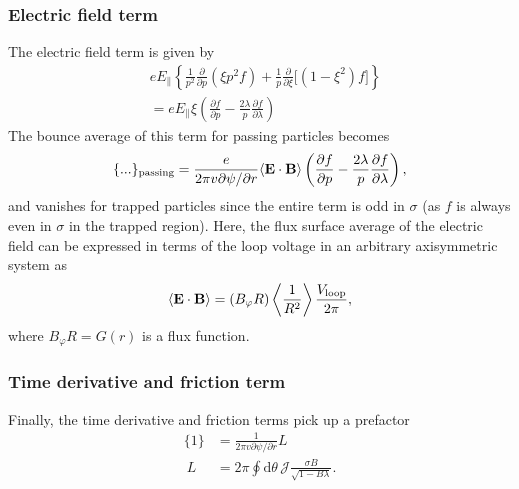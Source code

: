 \documentclass[11pt,a4paper]{article}
\newcommand{\rd}{\ensuremath{\mathrm{d}}}
\newcommand{\sub}[1]{\ensuremath{_{\text{#1}}}}
\renewcommand{\b}[1]{\ensuremath{ {\bf #1 } }}
\begin{document}
\subsubsection*{Electric field term}
The electric field term is given by
\begin{align}
&eE_\parallel \left\{\frac{1}{p^2}\frac{\partial}{\partial p}(\xi p^2 f) + \frac{1}{p}\frac{\partial}{\partial \xi}\Big[(1-\xi^2) f\Big] \right\} \nonumber \\
&= eE_\parallel \xi\left(\frac{\partial  f}{\partial p} - \frac{2\lambda}{p}\frac{\partial f}{\partial \lambda} \right)
\end{align}
The bounce average of this term for passing particles becomes
\begin{align}
\{...\}\sub{passing} = \frac{e}{2\pi v \partial \psi/\partial r} \langle \b{E}\cdot\b{B}\rangle \left(\frac{\partial  f}{\partial p} - \frac{2\lambda}{p}\frac{\partial f}{\partial \lambda} \right),
\end{align}
and vanishes for trapped particles since the entire term is odd in $\sigma$ (as $f$ is always even in $\sigma$ in the trapped region). Here, the flux surface average of the electric field can be expressed in terms of the loop voltage in an arbitrary axisymmetric system as
\begin{align}
\langle \b{E}\cdot\b{B} \rangle = (B_\varphi R) \left\langle\frac{1}{R^2}\right\rangle \frac{V\sub{loop}}{2\pi},
\end{align}
where $B_\varphi R = G(r)$ is a flux function.

\subsubsection*{Time derivative and friction term}
Finally, the time derivative and friction terms pick up a prefactor
\begin{align}
\{1\} &= \frac{1}{2\pi v \partial \psi/\partial r} L \nonumber \\\
L &= 2\pi \oint \rd\theta \, \mathcal{J}\frac{\sigma B}{\sqrt{1-B\lambda}}.
\end{align}
\end{document}
